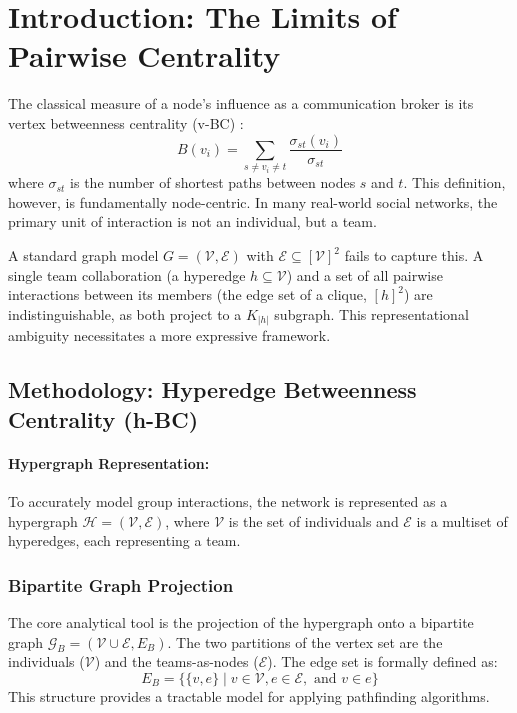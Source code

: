 \documentclass[10pt, a4paper]{article}
\begin{document}
\section{Introduction: The Limits of Pairwise Centrality}
The classical measure of a node's influence as a communication broker is its vertex betweenness centrality (v-BC) :
\begin{equation}
    B(v_i) = \sum_{s \neq v_i \neq t} \frac{\sigma_{st}(v_i)}{\sigma_{st}}
\end{equation}
where $\sigma_{st}$ is the number of shortest paths between nodes $s$ and $t$. This definition, however, is fundamentally node-centric. In many real-world social networks, the primary unit of interaction is not an individual, but a team.

A standard graph model $G=(\mathcal{V}, \mathcal{E})$ with $\mathcal{E} \subseteq [\mathcal{V}]^2$ fails to capture this. A single team collaboration (a hyperedge $h \subseteq \mathcal{V}$) and a set of all pairwise interactions between its members (the edge set of a clique, $[h]^2$) are indistinguishable, as both project to a $K_{|h|}$ subgraph. This representational ambiguity necessitates a more expressive framework.

\subsection{Methodology: Hyperedge Betweenness Centrality (h-BC)}

\paragraph{\textbf{Hypergraph Representation:}}
To accurately model group interactions, the network is represented as a hypergraph $\mathcal{H} = (\mathcal{V}, \mathcal{E})$, where $\mathcal{V}$ is the set of individuals and $\mathcal{E}$ is a multiset of hyperedges, each representing a team.

\subsubsection{Bipartite Graph Projection}
\label{{sec:projection}}
The core analytical tool is the projection of the hypergraph onto a bipartite graph $\mathcal{G}_B = (\mathcal{V} \cup \mathcal{E}, E_B)$. The two partitions of the vertex set are the individuals ($\mathcal{V}$) and the teams-as-nodes ($\mathcal{E}$). The edge set is formally defined as:
\begin{equation}
    E_B = \{ \{v, e\} \mid v \in \mathcal{V}, e \in \mathcal{E}, \text{ and } v \in e \}
\end{equation}
This structure provides a tractable model for applying pathfinding algorithms.
\end{document}

